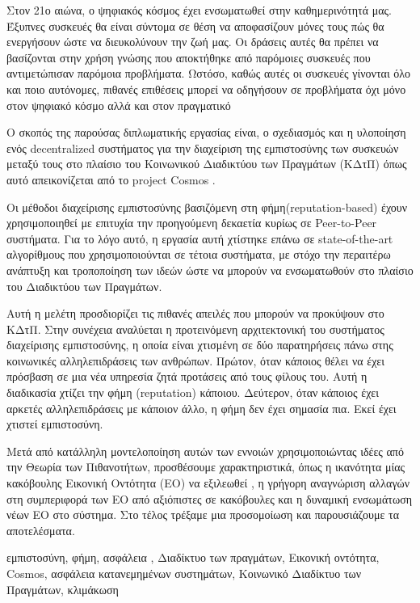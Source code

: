 \begin{abstractgr}
Στον 21ο αιώνα, ο ψηφιακός κόσμος έχει ενσωματωθεί στην καθημερινότητά μας. Έξυπνες συσκευές θα είναι σύντομα σε θέση να αποφασίζουν μόνες τους πώς θα ενεργήσουν ώστε να διευκολύνουν την ζωή μας.
Οι δράσεις αυτές θα πρέπει να βασίζονται στην χρήση γνώσης που αποκτήθηκε  από παρόμοιες συσκευές που αντιμετώπισαν    παρόμοια προβλήματα. Ωστόσο, καθώς αυτές οι συσκευές γίνονται όλο και ποιο αυτόνομες,
πιθανές επιθέσεις μπορεί να οδηγήσουν σε προβλήματα όχι μόνο στον ψηφιακό κόσμο αλλά και στον πραγματικό

Ο σκοπός της παρούσας διπλωματικής εργασίας είναι, ο σχεδιασμός και η υλοποίηση ενός decentralized συστήματος για την διαχείριση της εμπιστοσύνης των συσκευών μεταξύ τους στο πλαίσιο του
Κοινωνικού Διαδικτύου των Πραγμάτων (ΚΔτΠ)
 όπως αυτό απεικονίζεται από το project Cosmos .
 
Οι μέθοδοι διαχείρισης εμπιστοσύνης βασιζόμενη στη φήμη(reputation-based) έχουν χρησιμοποιηθεί με επιτυχία την προηγούμενη
δεκαετία κυρίως σε Peer-to-Peer συστήματα. Για το λόγο αυτό, η εργασία αυτή χτίστηκε επάνω σε 
state-of-the-art αλγορίθμους που χρησιμοποιούνται σε τέτοια συστήματα, με στόχο την περαιτέρω ανάπτυξη και τροποποίηση των
ιδεών ώστε να μπορούν να ενσωματωθούν στο πλαίσιο του Διαδικτύου των Πραγμάτων.
 
Αυτή η μελέτη προσδιορίζει τις πιθανές απειλές που μπορούν να προκύψουν στο ΚΔτΠ. Στην συνέχεια αναλύεται η προτεινόμενη αρχιτεκτονική του συστήματος διαχείρισης εμπιστοσύνης, η οποία είναι χτισμένη σε δύο παρατηρήσεις πάνω στης κοινωνικές αλληλεπιδράσεις των ανθρώπων.
 Πρώτον, όταν κάποιος θέλει να έχει πρόσβαση σε μια νέα υπηρεσία  ζητά προτάσεις από
τους φίλους του. Αυτή η διαδικασία χτίζει την φήμη (reputation) κάποιου. Δεύτερον, όταν κάποιος έχει αρκετές
αλληλεπιδράσεις με κάποιον άλλο, η φήμη δεν έχει σημασία πια. Εκεί έχει χτιστεί εμπιστοσύνη.
 
Μετά από κατάλληλη μοντελοποίηση αυτών των εννοιών χρησιμοποιώντας ιδέες από την Θεωρία των Πιθανοτήτων, προσθέσουμε χαρακτηριστικά, όπως
η ικανότητα μίας κακόβουλης Εικονική Οντότητα (ΕΟ) να εξιλεωθεί , η γρήγορη αναγνώριση 
αλλαγών στη συμπεριφορά των ΕΟ από αξιόπιστες σε κακόβουλες και η δυναμική ενσωμάτωση 
νέων ΕΟ στο σύστημα. Στο τέλος τρέξαμε μια προσομοίωση και παρουσιάζουμε τα αποτελέσματα.
	
    \begin{keywordsgr}
   εμπιστοσύνη, φήμη, ασφάλεια , Διαδίκτυο των πραγμάτων, Εικονική οντότητα, Cosmos, ασφάλεια κατανεμημένων συστημάτων, Κοινωνικό Διαδίκτυο των Πραγμάτων, κλιμάκωση
	\end{keywordsgr}
	
	
\end{abstractgr}


